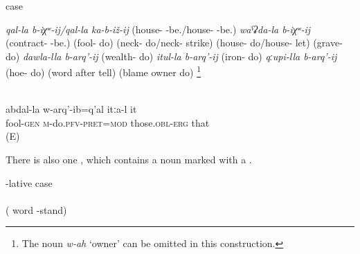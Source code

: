 \begin{exe}
	\ex	{} case	\label{ex:markednouncpgenitive}
	\begin{xlist}
		\ex \label{ex:markednouncpgenitiveget married} \textit{qal-la b-iχʷ-ij\slash qal-la ka-b-iž-ij} (house- -be.\slash house- -be.)  
		\ex \textit{waˁʡda-la b-iχʷ-ij} (contract- -be.) 
	\ex	{} (fool- do)  
	\ex	{} (neck- do\slash neck- strike) 
	\ex	{} (house- do\slash house- let) 
	\ex	{} (grave- do) 
	\ex \textit{dawla-lla b-arq'-ij} (wealth- do) 
	\ex \textit{itul-la b-arq'-ij} (iron- do)  \label{ex:IRON}
	\ex \textit{qːupi-lla b-arq'-ij} (hoe- do) 	\label{ex:WEED}
	\ex	{}  (word after tell) \label{exGossip}
	\ex	{} (blame owner do)  \footnote{The noun \textit{w-ah} `owner' can be omitted in this construction.} \label{ex:considerguilty} 
	\end{xlist}
\end{exe}

\begin{exe}
		\ex	{}  \label{ex:They took him for a foolCOMPOUND}\\
		\gll	abdal-la	w-arq'-ib=q'al	itːa-l	it\\
			fool-\textsc{gen}	\textsc{m}-do.\textsc{pfv}-\textsc{pret}=\textsc{mod}	those.\textsc{obl}-\textsc{erg}	that\\
		\glt	{} (E)
\end{exe}

There is also one , which contains a noun marked with a  .

\begin{exe}
			\ex	{}-lative case	\label{ex:markednouncplocative} \\   \\
			( word -stand) 
\end{exe}


